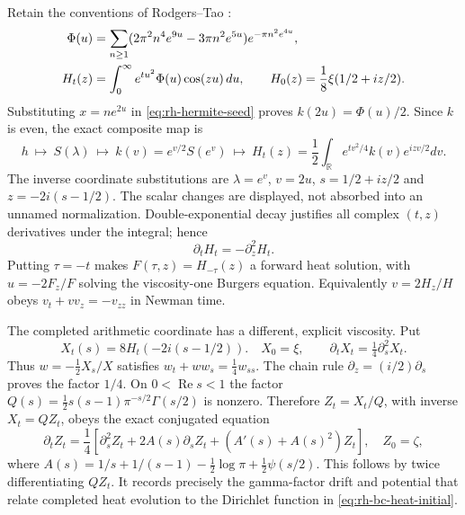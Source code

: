Retain the conventions of Rodgers--Tao \cite[\S1]{rodgersTao2020}:
\begin{align}
 \Phi(u)&=\sum_{n\ge1}
 (2\pi^2n^4e^{9u}-3\pi n^2e^{5u})e^{-\pi n^2e^{4u}},\notag\\
 H_t(z)&=\int_0^\infty e^{tu^2}\Phi(u)\cos(zu)\,du,\qquad
 H_0(z)=\frac18\xi(1/2+iz/2).
 \label{eq:rh-newman-definition}
\end{align}
Substituting $x=n e^{2u}$ in \eqref{eq:rh-hermite-seed} proves
$k(2u)=\Phi(u)/2$. Since $k$ is even, the exact composite map is
\begin{equation}
 h\ \longmapsto\ S(\lambda)\ \longmapsto\
 k(v)=e^{v/2}S(e^v)\ \longmapsto\
 H_t(z)=\frac12\int_{\mathbb R}
 e^{tv^2/4}k(v)e^{izv/2}dv .
 \label{eq:rh-cooling-newman-map}
\end{equation}
The inverse coordinate substitutions are $\lambda=e^v$, $v=2u$,
$s=1/2+iz/2$ and $z=-2i(s-1/2)$. The scalar changes are displayed,
not absorbed into an unnamed normalization. Double-exponential decay
justifies all complex $(t,z)$ derivatives under the integral; hence
\[
 \partial_tH_t=-\partial_z^2H_t.
\]
Putting $\tau=-t$ makes $F(\tau,z)=H_{-\tau}(z)$ a forward heat
solution, with $u=-2F_z/F$ solving the viscosity-one Burgers equation.
Equivalently $v=2H_z/H$ obeys $v_t+v v_z=-v_{zz}$ in Newman time.

The completed arithmetic coordinate has a different, explicit
viscosity. Put
\begin{equation}
 X_t(s)=8H_t(-2i(s-1/2)).
 \quad X_0=\xi,\qquad \partial_tX_t=\tfrac14\partial_s^2X_t.
 \label{eq:rh-completed-heat}
\end{equation}
Thus $w=-\frac12X_s/X$ satisfies
$w_t+w w_s=\frac14 w_{ss}$. The chain rule
$\partial_z=(i/2)\partial_s$ proves the factor $1/4$.
On $0<\operatorname{Re}s<1$ the factor
$Q(s)=\frac12s(s-1)\pi^{-s/2}\Gamma(s/2)$ is nonzero. Therefore
$Z_t=X_t/Q$, with inverse $X_t=QZ_t$, obeys the exact conjugated equation
\begin{equation}
 \partial_tZ_t=\frac14\left[
 \partial_s^2Z_t+2A(s)\partial_s Z_t+
 (A'(s)+A(s)^2)Z_t\right],\quad Z_0=\zeta,
 \label{eq:rh-completion-drift}
\end{equation}
where
$A(s)=1/s+1/(s-1)-\frac12\log\pi+\frac12\psi(s/2)$.
This follows by twice differentiating $QZ_t$.
It records precisely the gamma-factor drift and potential that relate
completed heat evolution to the Dirichlet function in
\eqref{eq:rh-bc-heat-initial}.

